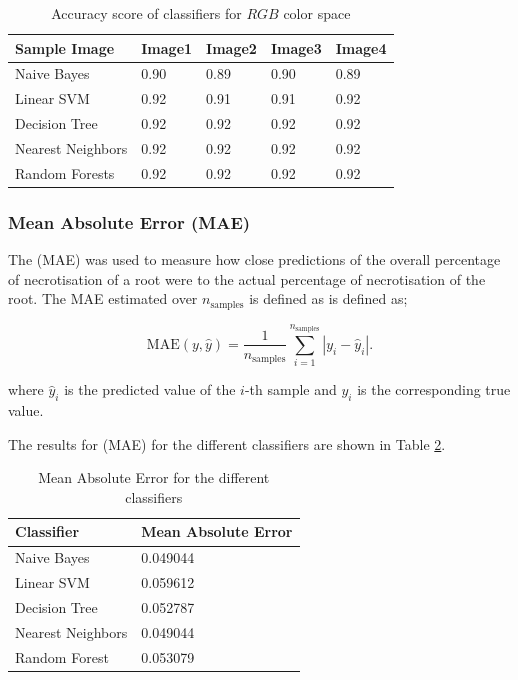\documentclass[conference]{IEEEtran}
\begin{document}
\begin{table}[t!]
\renewcommand{\arraystretch}{1.3}
\caption{Accuracy score of classifiers for $RGB$ color space }
\centering
    \begin{tabular}{|l|l|l|l|l|}
      \hline
      Sample Image &Image1 &Image2 & Image3 & Image4 \\ \hline

      Naive Bayes & 0.90  & 0.89 & 0.90 & 0.89 \\    \hline
      Linear SVM &  0.92 & 0.91 & 0.91  & 0.92 \\      \hline
      Decision Tree &  0.92 &  0.92 & 0.92 & 0.92 \\      \hline
      Nearest Neighbors &  0.92 &  0.92 & 0.92 & 0.92 \\      \hline
      Random Forests &  0.92 &  0.92 & 0.92 & 0.92 \\      \hline
    \end{tabular}

    \label{tbl:img11}
\end{table}


\subsubsection{Mean Absolute Error (MAE)}

The (MAE) was used to measure how close predictions of the overall percentage of necrotisation of a root were to the actual percentage of necrotisation of the root. The \ac{MAE} estimated over $n_{\text{samples}}$ is defined as is defined as;

\begin{equation}\label{eqn13}
    \text{MAE}(y, \hat{y}) = \frac{1}{n_{\text{samples}}} \sum_{i=1}^{n_{\text{samples}}} \left| y_{i} - \hat{y}_{i} \right|.
\end{equation}

\noindent where $\hat{y}_{i}$ is the predicted value of the $i$-th sample and $y_{i}$ is the corresponding true value.

\noindent The results for (MAE) for the different classifiers are shown in Table \ref{tbl:mae}.

\begin{table}[t!]
\renewcommand{\arraystretch}{1.3}
\caption{Mean Absolute Error for the different classifiers }\label{tbl:mae}
\centering

    \begin{tabular}{|l|l|}
    \hline
      Classifier & Mean Absolute Error  \\   \hline
      Naive Bayes & 0.049044    \\ \hline
      Linear SVM & 0.059612  \\    \hline
      Decision Tree &  0.052787  \\   \hline
      Nearest Neighbors & 0.049044   \\    \hline
      Random Forest & 0.053079   \\    \hline
    \end{tabular}

\end{table}
\end{document}
